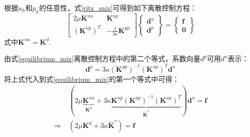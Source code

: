 根据$u_h$和$p_h$的任意性，式\eqref{ritz_mix}可得到如下离散控制方程：
\begin{equation}\label{equilibrium_mix}
    \begin{bmatrix}
        2\mu\boldsymbol K^{uu} & \boldsymbol K^{up} \\ (\boldsymbol K^{up})^T & -\frac{1}{3\kappa}\boldsymbol K^{pp}
    \end{bmatrix}
    \begin{Bmatrix}
        \boldsymbol d^u \\ \boldsymbol d^p 
    \end{Bmatrix} =
    \begin{Bmatrix}
        \boldsymbol f \\ \boldsymbol 0 
    \end{Bmatrix}
\end{equation}
式中$\boldsymbol K^{uu} = \boldsymbol K^d$. 

由式\eqref{equilibrium_mix}离散控制方程中的第二个等式，系数向量$d^p$可用$d^u$表示：
\begin{equation}
    \boldsymbol d^p = 3\kappa(\boldsymbol K^{pp})^{-1} (\boldsymbol K^{up})^T \boldsymbol d^u
\end{equation}
将上式代入到式\eqref{equilibrium_mix}的第一个等式中可得：
\begin{equation}\label{equilibrium_projection}
    \begin{split}
        &(2\mu\underbrace{\boldsymbol K^{uu}}_{\boldsymbol K^d} + 3\kappa \underbrace{\boldsymbol K^{up}(\boldsymbol K^{pp})^{-1}(\boldsymbol K^{up})^{T}}_{\tilde{\boldsymbol K}^v}) \boldsymbol d^u = \boldsymbol f \\
        \Rightarrow\;& (2\mu \boldsymbol K^d + 3\kappa \tilde{\boldsymbol K}^v) = \boldsymbol f
    \end{split}
\end{equation}

